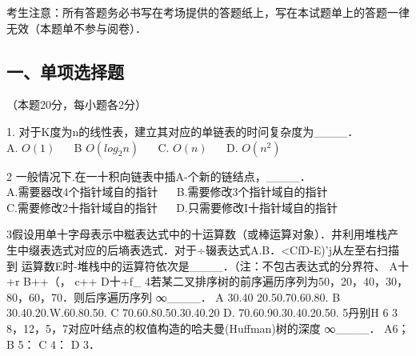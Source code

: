 

考生注意：所有答题务必书写在考场提供的答题纸上，写在本试题单上的答题一律无效（本题单不参与阅卷）．

\subsection{一、单项选择题}
（本题20分，每小题各2分）


1. 对于K度为n的线性表，建立其对应的单链表的时问复杂度为____． \\
A. $O(1)$ $\quad$ B $O(log_2n)$ $\quad$ C. $O(n)$ $\quad$ D. $O(n^2)$

2  一般情况下.在一十积向链表中插A-个新的链结点，____． \\
A.需要器改4个指针域自的指针 $\quad$ B.需要修改3个指针域自的指针 \\
C.需要修改2十指针域自的指针 $\quad$ D.只需要修改I十指针域自的指针


  3假设用单十字母表示中糍表达式中的十运算数（或棒运算对象）．井利用堆栈产
生中缀表选式对应的后墒表选式．对于÷辍表达式A.B．<CfD-E)'j从左至右扫描到
运算数E时-堆栈中的运算符依次是____．（注：不包古表达式的分界符、
  A十+r    B++（，    c++    D十+f_
  4若某二叉排序树的前序遍历序列为50，20，40，30，80，60，70．则后序遍历序列
∞____．
  A   30.40 20.50.70.60.80.    B 30.40.20.W.60.80.50.
  C  70.60.80.50.30.40.20    D. 70.60.90.30.40.20.50.
  5丹别H 6 3 8，12，5，7对应叶结点的权值构造的哈夫曼(Huffman)树的深度
∞____．
A6；    B 5：    C 4：    D 3．